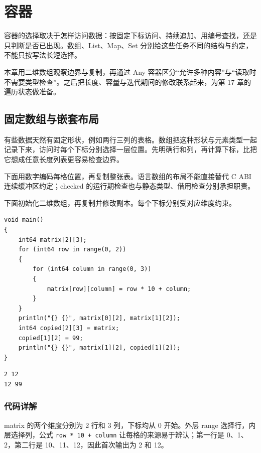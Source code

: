 \chapter{容器}
\label{ch:11}

容器的选择取决于怎样访问数据：按固定下标访问、持续追加、用编号查找，还是只判断是否已出现。数组、List、Map、Set 分别给这些任务不同的结构与约定，不能只按写法长短选择。

本章用二维数组观察边界与复制，再通过 Any 容器区分“允许多种内容”与“读取时不需要类型检查”。之后把长度、容量与迭代期间的修改联系起来，为第 17 章的遍历状态做准备。

\section{固定数组与嵌套布局}

有些数据天然有固定形状，例如两行三列的表格。数组把这种形状与元素类型一起记录下来，访问时每个下标分别选择一层位置。先明确行和列，再计算下标，比把它想成任意长度列表更容易检查边界。

下面用数字编码每格位置，再复制整张表。语言数组的布局不能直接替代 C ABI 连续缓冲区约定；checked 的运行期检查也与静态类型、借用检查分别承担职责。

下面初始化二维数组，再复制并修改副本。每个下标分别受对应维度约束。

\par
\medskip
\begin{lstlisting}[style=chali]
void main()
{
    int64 matrix[2][3];
    for (int64 row in range(0, 2))
    {
        for (int64 column in range(0, 3))
        {
            matrix[row][column] = row * 10 + column;
        }
    }
    println("{} {}", matrix[0][2], matrix[1][2]);
    int64 copied[2][3] = matrix;
    copied[1][2] = 99;
    println("{} {}", matrix[1][2], copied[1][2]);
}
\end{lstlisting}
\par
\medskip

\par
\medskip
\begin{lstlisting}[style=out]
2 12
12 99
\end{lstlisting}
\par
\medskip

\subsection*{代码详解}

matrix 的两个维度分别为 2 行和 3 列，下标均从 0 开始。外层 range 选择行，内层选择列，公式 \texttt{row * 10 + column} 让每格的来源易于辨认；第一行是 0、1、2，第二行是 10、11、12，因此首次输出为 2 和 12。

